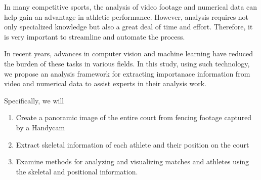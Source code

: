In many competitive sports, the analysis of video footage and numerical data can help gain an advantage in athletic performance. However, analysis requires not only specialized knowledge but also a great deal of time and effort. Therefore, it is very important to streamline and automate the process.

In recent years, advances in computer vision and machine learning have reduced the burden of these tasks in various fields. In this study, using such technology, we propose an analysis framework for extracting importanace information from video and numerical data to assist experts in their analysis work. 

Specifically, we will 
\begin{enumerate}
    \item Create a panoramic image of the entire court from fencing footage captured by a Handycam
    \item Extract skeletal information of each athlete and their position on the court
    \item Examine methods for analyzing and visualizing matches and athletes using the skeletal and positional information.
\end{enumerate}

